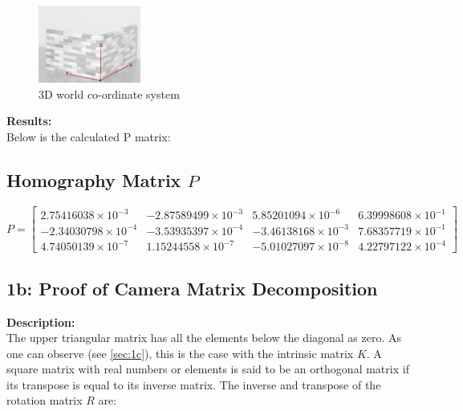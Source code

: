 \documentclass{article}
\begin{document}
    \begin{figure}[H] %
      \centering
      \includegraphics[width=0.3\textwidth]{axis.png} %
      \caption{3D world co-ordinate system}
      \label{fig:lego1}
  \end{figure}

\textbf{Results:} \\
Below is the calculated P matrix: 

\subsection*{Homography Matrix \( P \)}
\[
P =
\begin{bmatrix}
2.75416038 \times 10^{-3} & -2.87589499 \times 10^{-3} & 5.85201094 \times 10^{-6} & 6.39998608 \times 10^{-1} \\
-2.34030798 \times 10^{-4} & -3.53935397 \times 10^{-4} & -3.46138168 \times 10^{-3} & 7.68357719 \times 10^{-1} \\
4.74050139 \times 10^{-7} & 1.15244558 \times 10^{-7} & -5.01027097 \times 10^{-8} & 4.22797122 \times 10^{-4}
\end{bmatrix}
\]

\subsection{1b: Proof of Camera Matrix Decomposition}
\textbf{Description:} \\
The upper triangular matrix has all the elements below the diagonal as zero. As one can observe (see \ref{sec:1c}), this is the case with the intrinsic matrix \(K\). 
\newline
A square matrix with real numbers or elements is said to be an orthogonal matrix if its transpose is equal to its inverse matrix. 
The inverse and transpose of the rotation matrix \( R \) are: 
\end{document}
